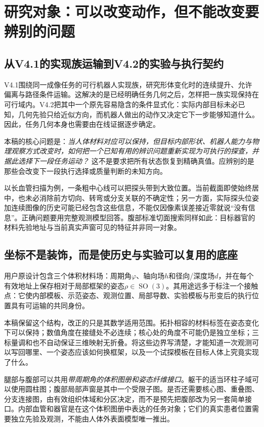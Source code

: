 \documentclass[11pt,a4paper]{article}
\numberwithin{equation}{section}
\theoremstyle{definition}
\DeclareMathOperator{\SO}{SO}
\begin{document}
\section{研究对象：可以改变动作，但不能改变要辨别的问题}
\label{front:problem}

\subsection{从V4.1的实现族运输到V4.2的实验与执行契约}
V4.1围绕同一成像任务的可行机器人实现族，研究形体变化时的连续提升、允许偏离与路径条件运输。这解决的是已经明确任务几何之后，怎样把一族实现保持在可行域内。V4.2把其中一个原先容易隐含的条件显式化：实际内部目标未必已知，几何先验只给近似方向，而机器人做出的动作又决定它下一步能够知道什么。因此，任务几何本身也需要由在线证据逐步确定。

本稿的核心问题是：\emph{当人体材料对应可以保持，但目标内部形状、机器人能力与物理观察方式改变时，如何把一个已知有用的辨识问题重新实现为可执行的探查，并据此选择下一段任务运动？} 这不是要求把所有状态恢复到精确真值。应辨别的是那些会改变下一段执行选择或质量判断的未知方向。

以长血管扫描为例，一条粗中心线可以把探头带到大致位置。当前截面即使始终居中，也未必消除前方切向、转弯或分支关联的不确定性；另一方面，实际探头位姿加连续图像的历史可能已经包含这些信息，不能仅因像素误差接近零就说“没有信息”。正确问题要用完整观测模型回答。腹部标准切面搜索同样如此：目标器官的材料先验地址与当前真实声窗可见的特征并非同一对象。

\subsection{坐标不是装饰，而是使历史与实验可以复用的底座}
用户原设计包含三个体积材料场：周期角$\varphi$、轴向场$h$和径向/深度场$d$，并在每个有效地址上保存相对于局部框架的姿态$\rho\in\SO(3)$。其用途远多于标注一个接触点：它使内部模板、示范姿态、观测位置、局部导数、实验模板与形变后的执行位置具有可运输的共同身份。

本稿保留这个结构，改正的只是其数学适用范围。拓扑相容的材料标签在姿态变化下可以保持；数值角度在接缝处不必连续；核心处的角度不可能仍是独立坐标；三标量调和也不自动保证三维映射无折叠。将这些边界写清楚，才能知道一次观测可以写回哪里、一个姿态应该如何换框架，以及一个试探模板在目标人体上究竟实现了什么。

腿部与腹部可以共用\emph{带周期角的体积图册和姿态纤维接口}。躯干的适当环柱子域可以使用圆柱图；腹部局部声窗是其中一个受限子图。是否还需要核心图、重叠图、分支连接图，由有效组织体域和分区决定，而不是预先把腹部改为另一套简单接口。内部血管和器官是在这个体积图册中表达的任务对象；它们的真实患者位置需要独立先验及观测，不能由人体外表面模型唯一推出。
\end{document}
